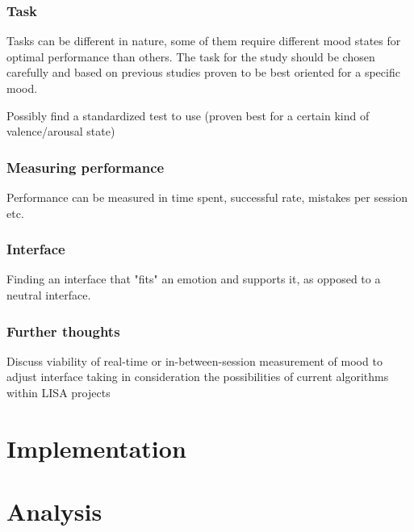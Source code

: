\subsubsection{Task}

Tasks can be different in nature, some of them require different mood states for optimal performance than others. The task for the study should be chosen carefully and based on previous studies proven to be best oriented for a specific mood.

Possibly find a standardized test to use (proven best for a certain kind of valence/arousal state)

\subsubsection{Measuring performance}

Performance can be measured in time spent, successful rate, mistakes per session etc.

\subsubsection{Interface}

Finding an interface that "fits" an emotion and supports it, as opposed to a neutral interface.

\subsubsection{Further thoughts}
Discuss viability of real-time or in-between-session measurement of mood to adjust interface taking in consideration the possibilities of current algorithms within LISA projects

\section{Implementation}

\section{Analysis}

